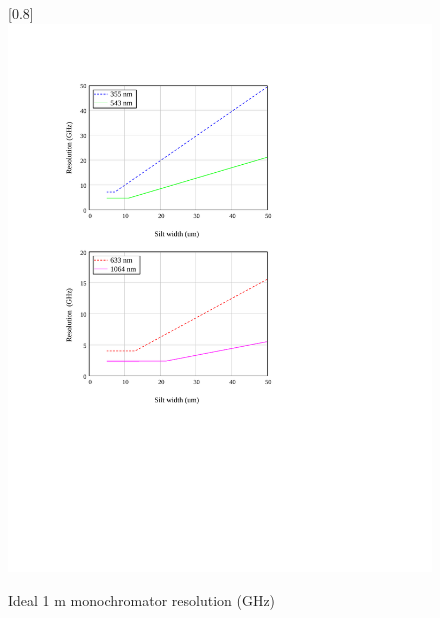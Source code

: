 \begin{figure}
\scalebox{0.8}[0.8]{
\includegraphics[bb=-30 250 489 700]
{near_GHz/near_GHz.pdf}
}
\caption{Ideal 1 m monochromator resolution (GHz)}
\label{near_GHz}
\end{figure}
